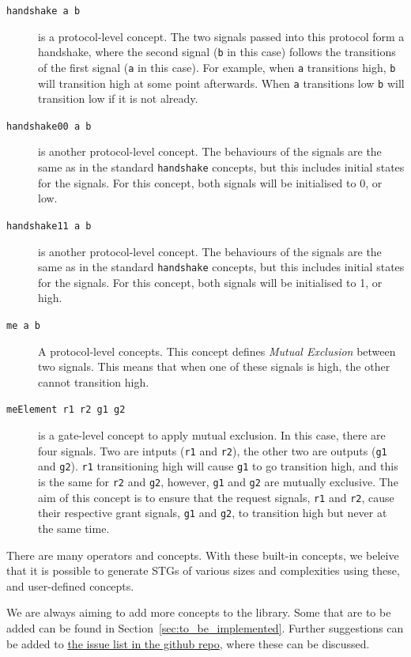 \documentclass{proc}
\begin{document}
\begin{description}
  \item [\texttt{handshake a b}] is a protocol-level concept. The two signals passed into this protocol form a handshake, where the second signal (\texttt{b} in this case) follows the 
  transitions of the first signal (\texttt{a} in this case). For example, when \texttt{a} transitions high, \texttt{b} will transition high at some point afterwards. When \texttt{a} transitions 
  low \texttt{b} will transition low if it is not already.
  
  \item [\texttt{handshake00 a b}] is another protocol-level concept. The behaviours of the signals are the same as in the standard \texttt{handshake} concepts, but this includes initial 
  states for the signals. For this concept, both signals will be initialised to 0, or low.
  
  \item [\texttt{handshake11 a b}] is another protocol-level concept. The behaviours of the signals are the same as in the standard \texttt{handshake} concepts, but this includes initial 
  states for the signals. For this concept, both signals will be initialised to 1, or high.
  
  \item [\texttt{me a b}] A protocol-level concepts. This concept defines \emph{Mutual Exclusion} between two signals. 
  This means that when one of these signals is high, the other cannot transition high.
  
  \item [\texttt{meElement r1 r2 g1 g2}] is a gate-level concept to apply mutual exclusion. In this case, there are four signals. Two are intputs (\texttt{r1} and \texttt{r2}), the other two 
  are outputs (\texttt{g1} and \texttt{g2}). \texttt{r1} transitioning high will cause \texttt{g1} to go transition high, and this is the same for \texttt{r2} and \texttt{g2}, however,
  \texttt{g1} and \texttt{g2} are mutually exclusive. The aim of this concept is to ensure that the request signals, \texttt{r1} and \texttt{r2}, cause their respective grant signals, 
  \texttt{g1} and \texttt{g2}, to transition high but never at the same time. 
  
\end{description}

There are many operators and concepts. With these built-in concepts, we beleive that it is possible to generate STGs of various sizes and complexities using these, and user-defined 
concepts. 

We are always aiming to add more concepts to the library. Some that are to be added can be found in Section~\ref{sec:to_be_implemented}. 
Further suggestions can be added to \href{https://github.com/tuura/concepts/issues}{the issue list in the github repo}, where these can be discussed.
\end{document}
